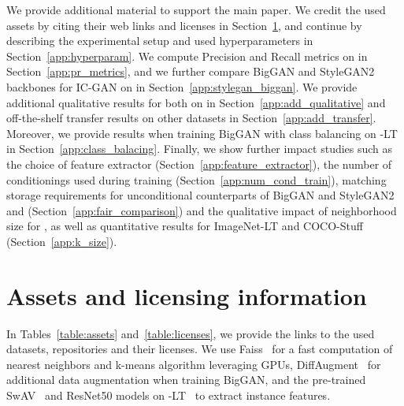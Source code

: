 We provide additional material to support the main paper. We credit the used assets by citing their web links and licenses in Section~\ref{app:assets}, and continue by describing the experimental setup and used hyperparameters in Section~\ref{app:hyperparam}. We compute Precision and Recall metrics on \ImNet in Section~\ref{app:pr_metrics}, and we further compare BigGAN and StyleGAN2 backbones for IC-GAN on \ImNet in Section~\ref{app:stylegan_biggan}. We provide additional qualitative results for both \ours on \ImNet in Section~\ref{app:add_qualitative} and \ours off-the-shelf transfer results on other datasets in Section~\ref{app:add_transfer}. Moreover, we provide results when training BigGAN with class balancing on \ImNet-LT in Section~\ref{app:class_balacing}. Finally, we show further impact studies such as the choice of feature extractor (Section~\ref{app:feature_extractor}), the number of conditionings used during training (Section~\ref{app:num_cond_train}), matching storage requirements for unconditional counterparts of BigGAN and StyleGAN2 and \ours (Section~\ref{app:fair_comparison}) and the qualitative impact of neighborhood size  for \ImNet, as well as quantitative results for ImageNet-LT and COCO-Stuff (Section~\ref{app:k_size}).




\section{Assets and licensing information}
\label{app:assets}
In Tables~\ref{table:assets} and~\ref{table:licenses}, we provide the links to the used datasets, repositories and their licenses. We use Faiss~\cite{JDH17} for a fast computation of nearest neighbors and k-means algorithm leveraging GPUs, DiffAugment~\cite{zhao2020differentiable} for additional data augmentation when training BigGAN, and the pre-trained SwAV~\cite{caron2020unsupervised} and ResNet50 models on \ImNet-LT~\cite{kang2019decoupling} to extract instance features. 

